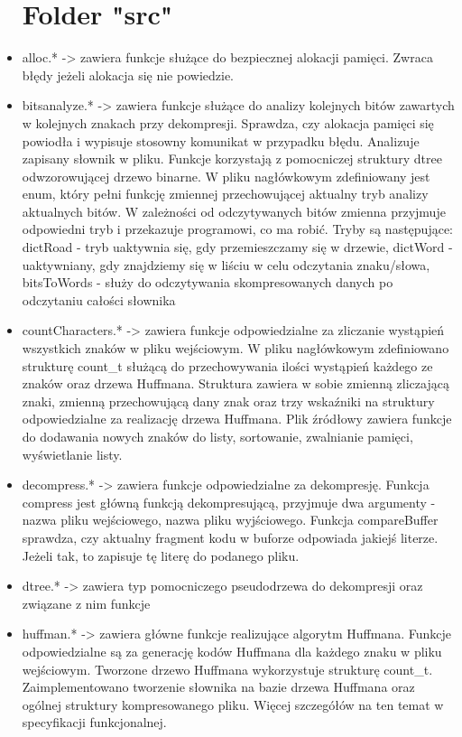 \documentclass[]{article}
\begin{document}
\begin{itemize}
\section{Folder "src"}\label{header-n231}
\item
alloc.* -> zawiera funkcje służące do bezpiecznej alokacji pamięci. Zwraca błędy jeżeli alokacja się nie powiedzie.
\item
bits\textunderscore analyze.* -> zawiera funkcje służące do analizy kolejnych bitów zawartych w kolejnych znakach przy dekompresji. Sprawdza, czy alokacja pamięci się powiodła i wypisuje stosowny komunikat w przypadku błędu. Analizuje zapisany słownik w pliku. Funkcje korzystają z pomocniczej struktury dtree odwzorowującej drzewo binarne. W pliku nagłówkowym zdefiniowany jest enum, który pełni funkcję zmiennej przechowującej aktualny tryb analizy aktualnych bitów. W zależności od odczytywanych bitów zmienna przyjmuje odpowiedni tryb i przekazuje programowi, co ma robić. Tryby są następujące: dictRoad - tryb uaktywnia się, gdy przemieszczamy się w drzewie, dictWord - uaktywniany, gdy znajdziemy się w liściu w celu odczytania znaku/słowa, bitsToWords - służy do odczytywania skompresowanych danych po odczytaniu całości słownika
\item
countCharacters.* -> zawiera funkcje odpowiedzialne za zliczanie wystąpień wszystkich znaków w pliku wejściowym. W pliku nagłówkowym zdefiniowano strukturę count\_t służącą do przechowywania ilości wystąpień każdego ze znaków oraz drzewa Huffmana. Struktura zawiera w sobie zmienną zliczającą znaki, zmienną przechowującą dany znak oraz trzy wskaźniki na struktury odpowiedzialne za realizację drzewa Huffmana. Plik źródłowy zawiera funkcje do dodawania nowych znaków do listy, sortowanie, zwalnianie pamięci, wyświetlanie listy.
\item
decompress.* -> zawiera funkcje odpowiedzialne za dekompresję. Funkcja compress jest główną funkcją dekompresującą, przyjmuje dwa argumenty - nazwa pliku wejściowego, nazwa pliku wyjściowego. Funkcja compareBuffer sprawdza, czy aktualny fragment kodu w buforze odpowiada jakiejś literze. Jeżeli tak, to zapisuje tę literę do podanego pliku.
\item
dtree.* -> zawiera typ pomocniczego pseudodrzewa do dekompresji oraz związane z nim funkcje
\item
huffman.* -> zawiera główne funkcje realizujące algorytm Huffmana. Funkcje odpowiedzialne są za generację kodów Huffmana dla każdego znaku w pliku wejściowym. Tworzone drzewo Huffmana wykorzystuje strukturę count\_t. Zaimplementowano tworzenie słownika na bazie drzewa Huffmana oraz ogólnej struktury kompresowanego pliku.  Więcej szczegółów na ten temat w specyfikacji funkcjonalnej.

\end{itemize}
\end{document}
